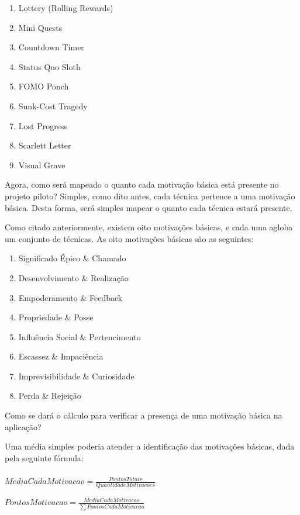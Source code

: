 \begin{multicols}{2}
\begin{enumerate}
        \item Lottery (Rolling Rewards)
        \item Mini Quests
        \item Countdown Timer
        \item Status Quo Sloth
        \item FOMO Ponch
        \item Sunk-Cost Tragedy
        \item Lost Progress
        \item Scarlett Letter
        \item Visual Grave
    \end{enumerate}
\end{multicols}

Agora, como será mapeado o quanto cada motivação básica está presente no projeto piloto? Simples, como dito antes,
cada técnica pertence a uma motivação básica. Desta forma, será simples mapear o quanto cada técnica estará presente.

Como citado anteriormente, existem oito motivações básicas, e cada uma agloba um conjunto de técnicas. As oito motivações básicas são as seguintes:

\begin{enumerate}
    \item Significado Épico \& Chamado
    \item Desenvolvimento \& Realização
    \item Empoderamento \& Feedback
    \item Propriedade \& Posse
    \item Influência Social \& Pertencimento
    \item Escassez \& Impaciência
    \item Imprevisibilidade \& Curiosidade
    \item Perda \& Rejeição
\end{enumerate}

Como se dará o cálculo para verificar a presença de uma motivação básica na aplicação?

Uma média simples poderia atender a identificação das motivações básicas, dada pela seguinte fórmula: \\ \\


$ MediaCadaMotivacao = \frac{PontosTotais}{QuantidadeMotivacoes} $

$ PontosMotivacao = \frac{MediaCadaMotivacao}{\sum PontosCadaMotivacao} $



